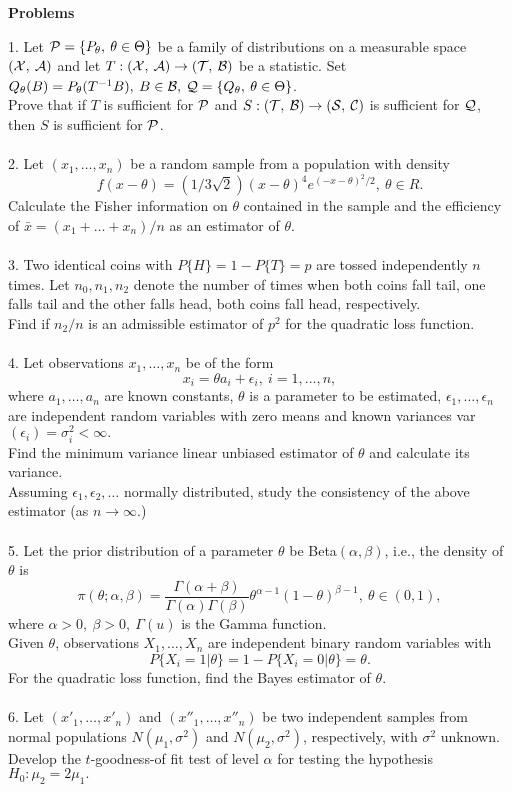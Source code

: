 \documentclass{article}
\begin{document}
\begin{center}
{\bf Problems}
\end{center}
1. Let ${\cal P}=\{P_{\theta},\:\theta\in \Theta\}$ be a family of distributions on a
measurable space $({\cal X},\:{\cal A})$ and let $T:({\cal X},\:{\cal A})\rightarrow
({\cal T},\:{\cal B})$ be a statistic. Set $Q_{\theta}(B)=P_{\theta}(T^{-1}B),\:B
\in {\cal B},\:
{\cal Q}=\{Q_{\theta},\:\theta\in \Theta\}$.\\
Prove that if $T$ is sufficient for ${\cal P}$ and $S:({\cal T},\:{\cal B})\rightarrow
({\cal S},\:{\cal C})$ is sufficient for ${\cal Q}$, then $S$ is sufficient for ${\cal P}$.\\
\\
2. Let $(x_{1},\ldots, x_{n})$ be a random sample from a population with density
\[f(x-\theta)=(1/3{\sqrt 2})(x-\theta)^{4}e^{(-x-\theta)^{2}/2},\:\theta \in R.\]
Calculate the Fisher information on $\theta$ contained in the sample and the
efficiency of $\bar x=(x_{1}+\ldots+x_{n})/n$ as an estimator of $\theta$.\\
\\
3. Two identical coins with $P\{H\}=1-P\{T\}=p$ are tossed independently $n$
times. Let $n_{0},n_{1},n_{2}$ denote the number of times when both coins fall
tail, one falls tail and the other falls head, both coins fall head, respectively.\\
Find if $n_{2}/n$ is an admissible estimator of $p^{2}$ for the quadratic loss function.\\
\\
4. Let observations $x_{1},\ldots, x_{n}$ be of the form
\[x_{i}=\theta a_{i}+\epsilon_{i},\:i=1,\ldots, n,\]
where $a_{1},\ldots, a_{n}$ are known constants, $\theta$ is a parameter to be
estimated, $\epsilon_{1},\ldots, \epsilon_{n}$ are independent random variables
with zero means and known variances var$(\epsilon_{i})=\sigma_{i}^{2}<\infty.$\\
Find the minimum variance linear unbiased estimator of $\theta$ and calculate its variance.\\
Assuming $\epsilon_{1},\epsilon_{2},\ldots$ normally distributed, study the consistency
of the above estimator (as $n\rightarrow \infty$.)\\
\\
5. Let the prior distribution of a parameter $\theta$ be Beta$(\alpha,\beta)$, i.e., the density of $\theta$ is
\[\pi(\theta;\alpha,\beta)=\frac{\Gamma(\alpha+\beta)}{\Gamma(\alpha)\Gamma(\beta)}\theta^{\alpha-1}(1-\theta)^{\beta-1},\:\theta\in (0,1),\]
where
$\alpha>0,\:\beta>0,\:\Gamma(u)$ is the Gamma function.\\
Given $\theta$, observations $X_{1},\ldots, X_{n}$ are independent binary
random variables with
\[P\{X_{i}=1|\theta\}=1-P\{X_{i}=0|\theta\}=\theta.\]
For the quadratic loss function, find the Bayes estimator of $\theta$.\\
\\
6. Let $(x'_{1},\ldots, x'_{n})$ and $(x''_{1},\ldots, x''_{n})$ be two independent
samples from normal populations $N(\mu_{1},\sigma^{2})$ and $N(\mu_{2},\sigma^{2})$,
respectively, with $\sigma^{2}$ unknown.\\
Develop the $t$-goodness-of fit test  of level $\alpha$ for testing the hypothesis
$H_{0}:\mu_{2}=2\mu_{1}.$
\end{document}
